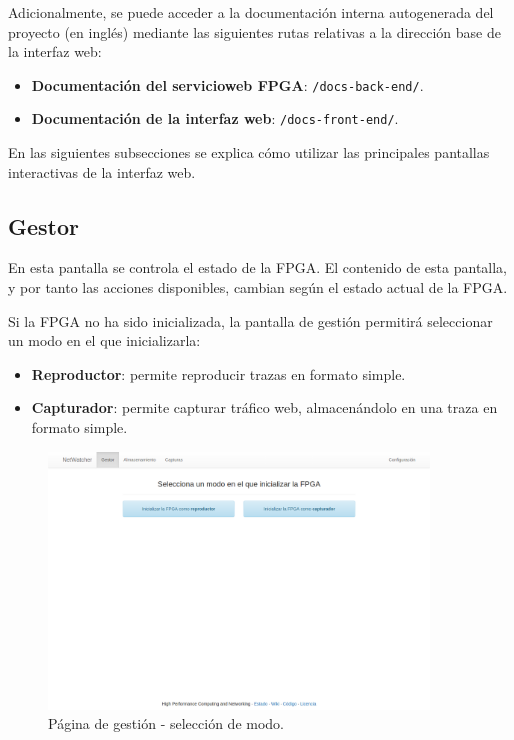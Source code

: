 Adicionalmente, se puede acceder a la documentación interna autogenerada del proyecto (en inglés) mediante las siguientes rutas relativas a la dirección base de la interfaz web:
\begin{itemize}
  \item \textbf{Documentación del \gls{servicioweb} \gls{FPGA}}: \texttt{/docs-back-end/}.
  \item \textbf{Documentación de la interfaz web}: \texttt{/docs-front-end/}.
\end{itemize}

En las siguientes subsecciones se explica cómo utilizar las principales pantallas interactivas de la interfaz web.


\subsection{Gestor\label{extra:manual:gestor}}

En esta pantalla se controla el estado de la \gls{FPGA}.
El contenido de esta pantalla, y por tanto las acciones disponibles, cambian según el estado actual de la \gls{FPGA}.

Si la \gls{FPGA} no ha sido inicializada, la pantalla de gestión permitirá seleccionar un modo en el que inicializarla:
\begin{itemize}
  \item \textbf{Reproductor}: permite reproducir \glspl{traza} en formato \gls{simple}.
  \item \textbf{Capturador}: permite capturar tráfico web, almacenándolo en una \gls{traza} en formato \gls{simple}.
\end{itemize}

\begin{figure}[!htp]
  \centering
  \includegraphics[width=0.9\textwidth,clip=true]{graphics/capturas/gestor_seleccion}
  \caption{Página de gestión - selección de modo.}
  \label{fig:captura:gestionseleccion}
\end{figure}

